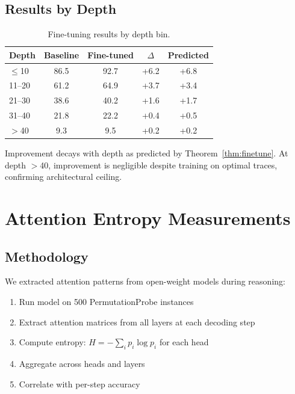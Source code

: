 \documentclass{article}
\theoremstyle{plain}
\theoremstyle{definition}
\theoremstyle{remark}
\begin{document}
\subsection{Results by Depth}

\begin{table}[h]
\centering
\caption{Fine-tuning results by depth bin.}
\label{tab:finetune_depth}
\small
\begin{tabular}{@{}lcccc@{}}
\toprule
\textbf{Depth} & \textbf{Baseline} & \textbf{Fine-tuned} & \textbf{$\Delta$} & \textbf{Predicted} \\
\midrule
$\leq$10 & 86.5 & 92.7 & +6.2 & +6.8 \\
11--20 & 61.2 & 64.9 & +3.7 & +3.4 \\
21--30 & 38.6 & 40.2 & +1.6 & +1.7 \\
31--40 & 21.8 & 22.2 & +0.4 & +0.5 \\
$>$40 & 9.3 & 9.5 & +0.2 & +0.2 \\
\bottomrule
\end{tabular}
\end{table}

Improvement decays with depth as predicted by Theorem~\ref{thm:finetune}. At depth $>$40, improvement is negligible despite training on optimal traces, confirming architectural ceiling.


\section{Attention Entropy Measurements}
\label{app:attention}

\subsection{Methodology}

We extracted attention patterns from open-weight models during reasoning:
\begin{enumerate}
\item Run model on 500 PermutationProbe instances
\item Extract attention matrices from all layers at each decoding step
\item Compute entropy: $H = -\sum_i p_i \log p_i$ for each head
\item Aggregate across heads and layers
\item Correlate with per-step accuracy
\end{enumerate}
\end{document}
